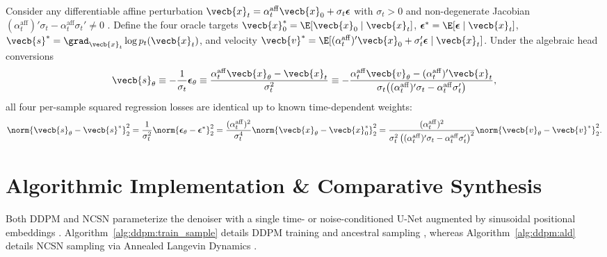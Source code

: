\documentclass[../../../../master.tex]{subfiles}
\begin{document}
\begin{coremath}
\label{thm:ddpm:four_way}
Consider any differentiable affine perturbation $\vecb{x}_t = \alpha_t^{\mathrm{aff}} \vecb{x}_0 + \sigma_t \boldsymbol{\epsilon}$ with $\sigma_t > 0$ and non-degenerate Jacobian $(\alpha_t^{\mathrm{aff}})'\sigma_t - \alpha_t^{\mathrm{aff}}\sigma_t' \neq 0$ . Define the four oracle targets $\vecb{x}_0^* = \E[\vecb{x}_0 \mid \vecb{x}_t]$, $\boldsymbol{\epsilon}^* = \E[\boldsymbol{\epsilon} \mid \vecb{x}_t]$, $\vecb{s}^* = \grad_{\vecb{x}_t}\log p_t(\vecb{x}_t)$, and velocity $\vecb{v}^* = \E[(\alpha_t^{\mathrm{aff}})'\vecb{x}_0 + \sigma_t'\boldsymbol{\epsilon} \mid \vecb{x}_t]$. Under the algebraic head conversions
\begin{equation}\label{eq:ddpm:head_conversions}
  \vecb{s}_\theta \equiv -\frac{1}{\sigma_t}\boldsymbol{\epsilon}_\theta \equiv \frac{\alpha_t^{\mathrm{aff}}\vecb{x}_\theta - \vecb{x}_t}{\sigma_t^2} \equiv -\frac{\alpha_t^{\mathrm{aff}} \vecb{v}_\theta - (\alpha_t^{\mathrm{aff}})' \vecb{x}_t}{\sigma_t\!\left((\alpha_t^{\mathrm{aff}})'\sigma_t - \alpha_t^{\mathrm{aff}}\sigma_t'\right)},
\end{equation}
all four per-sample squared regression losses are identical up to known time-dependent weights:
\begin{equation}\label{eq:ddpm:loss_equiv}
  \norm{\vecb{s}_\theta - \vecb{s}^*}_2^2 = \frac{1}{\sigma_t^2}\norm{\boldsymbol{\epsilon}_\theta - \boldsymbol{\epsilon}^*}_2^2 = \frac{(\alpha_t^{\mathrm{aff}})^2}{\sigma_t^4}\norm{\vecb{x}_\theta - \vecb{x}_0^*}_2^2 = \frac{(\alpha_t^{\mathrm{aff}})^2}{\sigma_t^2\left((\alpha_t^{\mathrm{aff}})'\sigma_t - \alpha_t^{\mathrm{aff}}\sigma_t'\right)^2}\norm{\vecb{v}_\theta - \vecb{v}^*}_2^2.
\end{equation}
\end{coremath}

\section{Algorithmic Implementation \& Comparative Synthesis}\label{sec:ddpm:algorithms}

Both DDPM and NCSN parameterize the denoiser with a single time- or noise-conditioned U-Net augmented by sinusoidal positional embeddings  . Algorithm~\ref{alg:ddpm:train_sample} details DDPM training and ancestral sampling , whereas Algorithm~\ref{alg:ddpm:ald} details NCSN sampling via Annealed Langevin Dynamics  .
\end{document}
